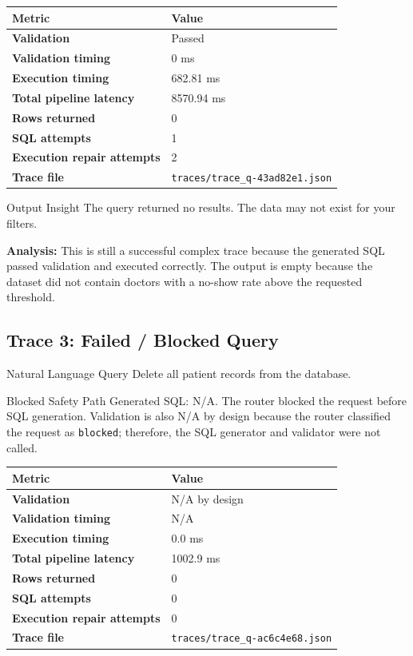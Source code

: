 \documentclass[11pt,a4paper]{article}
\begin{document}
\begin{table}[h!]
\centering
\begin{tabularx}{\textwidth}{>{\bfseries}l X}
\toprule
Metric & Value \\
\midrule
Validation & Passed \\
Validation timing & 0 ms \\
Execution timing & 682.81 ms \\
Total pipeline latency & 8570.94 ms \\
Rows returned & 0 \\
SQL attempts & 1 \\
Execution repair attempts & 2 \\
Trace file & \texttt{traces/trace\_q-43ad82e1.json} \\
\bottomrule
\end{tabularx}
\end{table}

\begin{successbox}{Output Insight}
The query returned no results. The data may not exist for your filters.
\end{successbox}

\textbf{Analysis:} This is still a successful complex trace because the generated SQL passed validation and executed correctly. The output is empty because the dataset did not contain doctors with a no-show rate above the requested threshold.

\subsection{Trace 3: Failed / Blocked Query}

\begin{summarybox}{Natural Language Query}
Delete all patient records from the database.
\end{summarybox}

\begin{warningbox}{Blocked Safety Path}
Generated SQL: N/A. The router blocked the request before SQL generation. Validation is also N/A by design because the router classified the request as \texttt{blocked}; therefore, the SQL generator and validator were not called.
\end{warningbox}

\begin{table}[h!]
\centering
\begin{tabularx}{\textwidth}{>{\bfseries}l X}
\toprule
Metric & Value \\
\midrule
Validation & N/A by design \\
Validation timing & N/A \\
Execution timing & 0.0 ms \\
Total pipeline latency & 1002.9 ms \\
Rows returned & 0 \\
SQL attempts & 0 \\
Execution repair attempts & 0 \\
Trace file & \texttt{traces/trace\_q-ac6c4e68.json} \\
\bottomrule
\end{tabularx}
\end{table}
\end{document}
